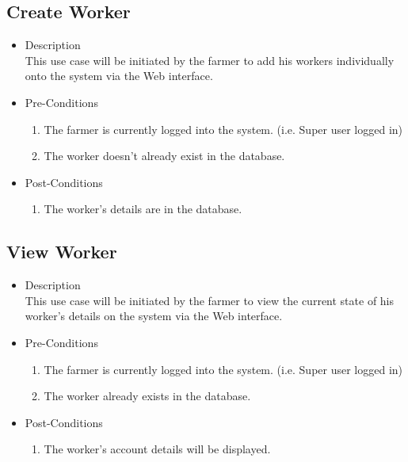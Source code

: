 \documentclass[11pt,fleqn]{book} %
\begin{document}
		\subsection{Create Worker}
		\begin{itemize}
			\item Description\\
			This use case will be initiated by the farmer to add his workers individually onto the system via the Web interface.
			\item Pre-Conditions
			\begin{enumerate}
				\item The farmer is currently logged into the system. (i.e. Super user logged in)
				\item The worker doesn’t already exist in the database.
			\end{enumerate}
			\item Post-Conditions
			\begin{enumerate}
				\item The worker’s details are in the database.			
			\end{enumerate}
		\end{itemize}
		
		\subsection{View Worker}
		\begin{itemize}
			\item Description\\
			This use case will be initiated by the farmer to view the current state of his worker’s details on the system via the Web interface.
			\item Pre-Conditions
			\begin{enumerate}
				\item The farmer is currently logged into the system. (i.e. Super user logged in)
				\item The worker already exists in the database.					
			\end{enumerate}
			\item Post-Conditions
			\begin{enumerate}
				\item The worker’s account details will be displayed.
			\end{enumerate}
		\end{itemize}
		
\end{document}
